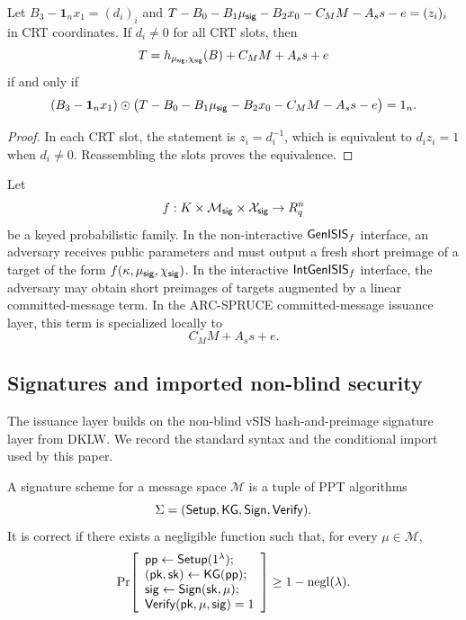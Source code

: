 \begin{lemma}\label{lem:hash-cleared-admissible}
Let \(B_3-\mathbf 1_nx_1=(d_i)_i\) and
\(T-B_0-B_1\mu_{\mathsf{sig}}-B_2x_0-C_MM-A_s s-e=(z_i)_i\) in CRT coordinates.  If \(d_i\neq 0\) for all CRT slots, then
\[
  T=h_{\mu_{\mathsf{sig}},\chi_{\mathsf{sig}}}(B)+C_MM+A_s s+e
\]
if and only if
\[
  (B_3-\mathbf 1_nx_1)\odot
  \bigl(T-B_0-B_1\mu_{\mathsf{sig}}-B_2x_0-C_MM-A_s s-e\bigr)=1_n.
\]
\end{lemma}

\begin{proof}
In each CRT slot, the statement is \(z_i=d_i^{-1}\), which is equivalent to \(d_i z_i=1\) when \(d_i\neq0\).
Reassembling the slots proves the equivalence.
\end{proof}

\begin{definition}\label{def:genisis-interface}
Let
\[
  f:K\times\mathcal M_{\mathsf{sig}}\times\mathcal X_{\mathsf{sig}}\to R_q^n
\]
be a keyed probabilistic family.  In the non-interactive \(\mathsf{GenISIS}_f\) interface, an adversary receives public
parameters and must output a fresh short preimage of a target of the form
\(f(\kappa,\mu_{\mathsf{sig}},\chi_{\mathsf{sig}})\).  In the interactive \(\mathsf{IntGenISIS}_f\) interface, the adversary may obtain short
preimages of targets augmented by a linear committed-message term.  In the ARC-SPRUCE committed-message issuance
layer, this term is specialized locally to
\[
  C_MM+A_s s+e.
\]
\end{definition}

\subsection{Signatures and imported non-blind security}
\label{subsec:prelim-signatures}
The issuance layer builds on the non-blind vSIS hash-and-preimage signature layer from DKLW.  We record the
standard syntax and the conditional import used by this paper.

\begin{definition}\label{def:signature-scheme}
A signature scheme for a message space \(\mathcal M\) is a tuple of PPT algorithms
\[
  \Sigma=(\mathsf{Setup},\mathsf{KG},\mathsf{Sign},\mathsf{Verify}).
\]
It is correct if there exists a negligible function such that, for every \(\mu\in\mathcal M\),
\[
\Pr\!\left[
\begin{array}{l}
  \mathsf{pp}\gets\mathsf{Setup}(1^\lambda);\\
  (\mathsf{pk},\mathsf{sk})\gets\mathsf{KG}(\mathsf{pp});\\
  \mathsf{sig}\gets\mathsf{Sign}(\mathsf{sk},\mu);\\
  \mathsf{Verify}(\mathsf{pk},\mu,\mathsf{sig})=1
\end{array}
\right]
\ge 1-\mathrm{negl}(\lambda).
\]
\end{definition}

